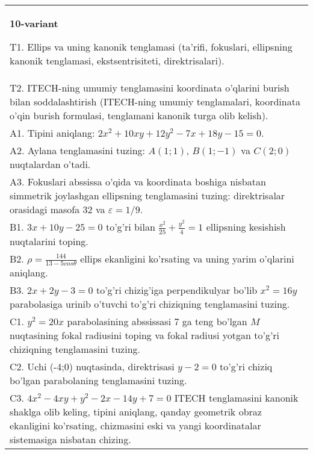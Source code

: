 \documentclass{article}
\begin{document}
\begin{tabular}{m{17cm}}
\textbf{10-variant}
\newline

T1. Ellips va uning kanonik tenglamasi (ta'rifi, fokuslari, ellipsning kanonik tenglamasi, ekstsentrisiteti, direktrisalari).\\

T2. ITECH-ning umumiy tenglamasini koordinata o'qlarini burish bilan soddalashtirish (ITECH-ning umumiy tenglamalari, koordinata o'qin burish formulasi, tenglamani kanonik turga olib kelish).\\

A1. Tipini aniqlang: $2x^{2}+10xy+12y^{2}-7x+18y-15=0$.\\

A2. Aylana tenglamasini tuzing: $A(1;1)$, $B(1;-1)$ va $C(2;0)$ nuqtalardan o'tadi.\\

A3. Fokuslari abssissa o'qida va koordinata boshiga nisbatan simmetrik joylashgan ellipsning tenglamasini tuzing: direktrisalar orasidagi masofa $32$ va $\varepsilon=1/9$.\\

B1. $3x + 10y - 25 = 0$ to'g'ri bilan $\frac{x^{2}}{25} + \frac{y^{2}}{4} = 1$ ellipsning kesishish nuqtalarini toping.  \\

B2. $\rho = \frac{144}{13 - 5cos\theta}$ ellips ekanligini ko'rsating va uning yarim o'qlarini aniqlang.\\

B3. $2x + 2y - 3 = 0$ to'g'ri chizig'iga perpendikulyar bo'lib $x^{2} = 16y$ parabolasiga urinib o'tuvchi to'g'ri chiziqning tenglamasini tuzing.  \\

C1. $y^{2} = 20x$ parabolasining abssissasi 7 ga teng bo'lgan $M$ nuqtasining fokal radiusini toping va fokal radiusi yotgan to'g'ri chiziqning tenglamasini tuzing.  \\

C2. Uchi (-4;0) nuqtasinda, direktrisasi $y - 2 = 0$ to'g'ri chiziq bo'lgan parabolaning tenglamasini tuzing.\\

C3. $4x^{2} - 4xy + y^{2} - 2x - 14y + 7 = 0$ ITECH tenglamasini kanonik shaklga olib keling, tipini aniqlang, qanday geometrik obraz ekanligini ko'rsating, chizmasini eski va yangi koordinatalar sistemasiga nisbatan chizing.  \\

\end{tabular}
\vspace{1cm}
\end{document}
